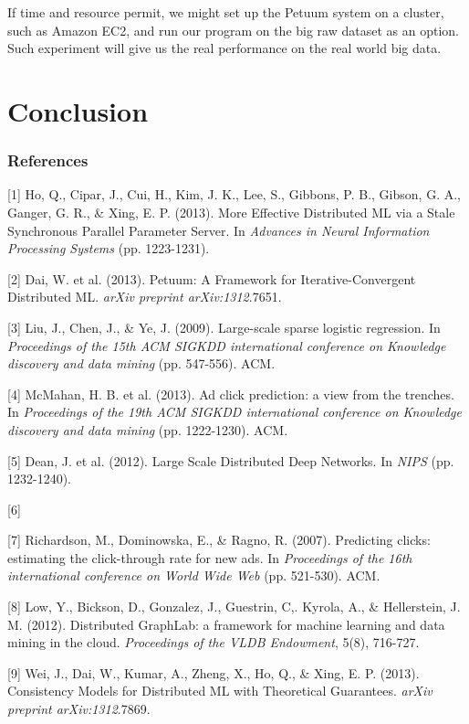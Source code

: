 \documentclass{article} %
\begin{document}
If time and resource permit, we might set up the Petuum system on a cluster, such as Amazon EC2, and run our program on the big raw dataset as an option. Such experiment will give us the real performance on the real world big data.

\section{Conclusion}


\subsubsection*{References}

\small{
[1] Ho, Q., Cipar, J., Cui, H., Kim, J. K., Lee, S., Gibbons, P. B., Gibson, G. A., Ganger, G. R., \& Xing, E. P. (2013). More Effective Distributed ML via a Stale Synchronous Parallel Parameter Server. In {\it Advances in Neural Information Processing Systems} (pp. 1223-1231).

[2] Dai, W. et al. (2013). Petuum: A Framework for Iterative-Convergent Distributed ML. {\it arXiv preprint arXiv:1312}.7651.

[3] Liu, J., Chen, J., \& Ye, J. (2009). Large-scale sparse logistic regression. In {\it Proceedings of the 15th ACM SIGKDD international conference on Knowledge discovery and data mining} (pp. 547-556). ACM.

[4] McMahan, H. B. et al. (2013). Ad click prediction: a view from the trenches. In {\it Proceedings of the 19th ACM SIGKDD international conference on Knowledge discovery and data mining} (pp. 1222-1230). ACM.

[5] Dean, J. et al. (2012). Large Scale Distributed Deep Networks. In {\it NIPS} (pp. 1232-1240).

[6]

[7] Richardson, M., Dominowska, E., \& Ragno, R. (2007). Predicting clicks: estimating the click-through rate for new ads. In {\it Proceedings of the 16th international conference on World Wide Web} (pp. 521-530). ACM.

[8] Low, Y., Bickson, D., Gonzalez, J., Guestrin, C,. Kyrola, A., \& Hellerstein, J. M. (2012). Distributed GraphLab: a framework for machine learning and data mining in the cloud. {\it Proceedings of the VLDB Endowment}, 5(8), 716-727.

[9] Wei, J., Dai, W., Kumar, A., Zheng, X., Ho, Q., \& Xing, E. P. (2013). Consistency Models for Distributed ML with Theoretical Guarantees. {\it arXiv preprint arXiv:1312}.7869.

}
\end{document}
